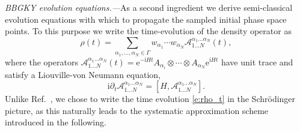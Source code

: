 \documentclass[aps,prl,showpacs,amsmath,amssymb,superscriptaddress,reprint,10pt]{revtex4-1}
\newcommand\ee{{\mathrm{e}}}
\newcommand\ii{{\mathrm{i}}}
\newcommand{\Com}[2]{\left[{#1},{#2}\right]}
\begin{document}
\begin{bibunit}
{\em BBGKY evolution equations.---}As a second ingredient we derive semi-classical evolution equations with which to propagate the sampled initial phase space points. To this purpose we write the time-evolution of the density operator as
\begin{equation}\label{e:rho_t}
\rho(t)=\sum_{\alpha_1,\dotsc,\alpha_N\in\Gamma}w_{\alpha_1}\cdots w_{\alpha_N} \mathscr{A}_{1\dotsc N}^{\alpha_1\dotsc\alpha_N}(t),
\end{equation}
where the operators $\mathscr{A}_{1\dotsc N}^{\alpha_1\dotsc\alpha_N}(t)=\ee^{-\ii Ht}A_{\alpha_i}\otimes\cdots\otimes A_{\alpha_N}\ee^{\ii Ht}$  have unit trace and satisfy a Liouville-von Neumann equation,
\begin{equation}\label{VNeqdWA}
\ii\partial_t \mathscr{A}_{1\dotsc N}^{\alpha_1\dotsc\alpha_N} = \Com{H}{\mathscr{A}_{1\dotsc N}^{\alpha_1\dotsc\alpha_N}}.
\end{equation}
Unlike Ref.~\cite{Schachenmayer_etal15}, we chose to write the time evolution \eqref{e:rho_t} in the Schr\"odinger picture, as this naturally leads to the systematic approximation scheme introduced in the following.


\end{bibunit}
\end{document}
